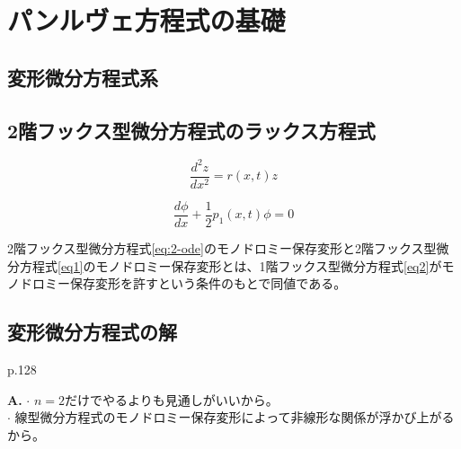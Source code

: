 
\section{パンルヴェ方程式の基礎}

\subsection{変形微分方程式系}

\subsection{2階フックス型微分方程式のラックス方程式}

\begin{equation}\label{eq1}
\frac{d^{2}z}{dx^{2}}=r(x,t)z
\end{equation}

\begin{equation}\label{eq2}
\frac{d\phi}{dx}+\frac{1}{2}p_{1}(x,t)\phi=0
\end{equation}

\begin{proposition}
    2階フックス型微分方程式\eqref{eq:2-ode}のモノドロミー保存変形と2階フックス型微分方程式\eqref{eq1}のモノドロミー保存変形とは、1階フックス型微分方程式\eqref{eq2}がモノドロミー保存変形を許すという条件のもとで同値である。
\end{proposition}

\subsection{変形微分方程式の解}

p.128
\begin{Q}[なぜ$n$階の変形微分方程式系を考えるのか？]
\textbf{A.} $\cdot$ $n=2$だけでやるよりも見通しがいいから。\\
$\cdot$ 線型微分方程式のモノドロミー保存変形によって非線形な関係が浮かび上がるから。
\end{Q}

